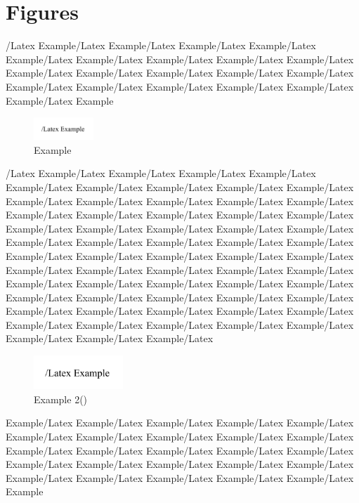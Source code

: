 \documentclass[a4paper 14pt]{article}
\numberwithin{figure}{section} %
\numberwithin{table}{section} %
\begin{document}
\section{Figures}
/Latex Example/Latex Example/Latex Example/Latex Example/Latex Example/Latex Example/Latex Example/Latex Example/Latex Example/Latex Example/Latex Example/Latex Example/Latex Example/Latex Example/Latex Example/Latex Example/Latex Example/Latex Example/Latex Example/Latex Example/Latex Example
\begin{figure}[htbp]
	\centering
	\includegraphics[width=0.2\textwidth]{figures//example.png}
	\caption{Example}
\end{figure}
/Latex Example/Latex Example/Latex Example/Latex Example/Latex Example/Latex Example/Latex Example/Latex Example/Latex Example/Latex Example/Latex Example/Latex Example/Latex Example/Latex Example/Latex Example/Latex Example/Latex Example/Latex Example/Latex Example/Latex Example/Latex Example/Latex Example/Latex Example/Latex Example/Latex Example/Latex Example/Latex Example/Latex Example/Latex Example/Latex Example/Latex Example/Latex Example/Latex Example/Latex Example/Latex Example/Latex Example/Latex Example/Latex Example/Latex Example/Latex Example/Latex Example/Latex Example/Latex Example/Latex Example/Latex Example/Latex Example/Latex Example/Latex Example/Latex Example/Latex Example/Latex Example/Latex Example/Latex Example/Latex Example/Latex Example/Latex Example/Latex Example/Latex Example/Latex Example/Latex Example/Latex Example/Latex Example/Latex \begin{figure}
	\vspace{-20pt}
	\begin{center}
		\includegraphics[width=0.3\textwidth]{figures//example.png}
	\end{center}
	\vspace{-20pt}
	\caption{Example 2()}
	\vspace{-10pt}
\end{figure}Example/Latex Example/Latex Example/Latex Example/Latex Example/Latex Example/Latex Example/Latex Example/Latex Example/Latex Example/Latex Example/Latex Example/Latex Example/Latex Example/Latex Example/Latex Example/Latex Example/Latex Example/Latex Example/Latex Example/Latex Example/Latex Example/Latex Example/Latex Example/Latex Example/Latex Example
\end{document}
